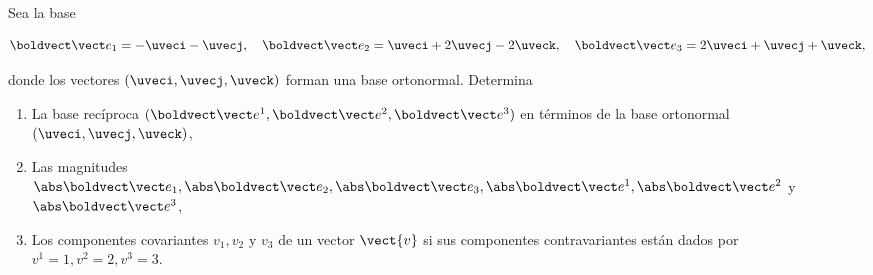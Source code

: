 \documentclass[../main.tex]{subfiles}
\begin{document}
\begin{problema}
	Sea la base

	\begin{equation*}
		\ev{1} = -\uveci - \uvecj,\quad \ev{2} = \uveci + 2\uvecj - 2\uveck,
		\quad \ev{3} = 2\uveci + \uvecj + \uveck,
	\end{equation*}

	donde los vectores \((\uveci, \uvecj, \uveck)\) forman una base ortonormal. Determina

	\begin{enumerate}
		\item La base recíproca \((\evc{1}, \evc{2}, \evc{3})\) en términos de
		      la base ortonormal \((\uveci, \uvecj, \uveck)\),
		\item Las magnitudes \(\nev{1}, \nev{2}, \nev{3}, \nevc{1}, \nevc{2}\) y \(\nevc{3}\),
		\item Los componentes covariantes \(v_{1}, v_{2}\) y \(v_{3}\) de un vector
		      \(\vect{v}\) si sus componentes contravariantes están dados por
		      \(v^{1} = 1, v^{2} = 2, v^{3} = 3\).
	\end{enumerate}
\end{problema}
\end{document}
